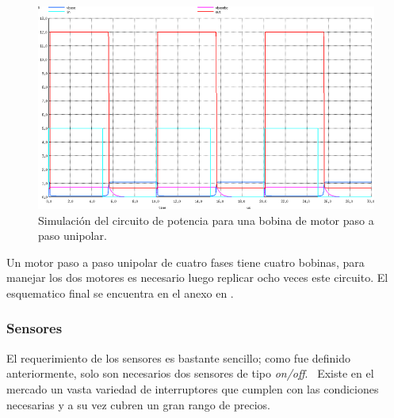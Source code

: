\begin{figure}[htp]
\centering
\includegraphics[width=15cm]{./img/cir_single_coil_plot.png}
\caption{Simulaci\'on del circuito de potencia para una bobina de motor paso a
paso unipolar.}
\label{fig:cir_single_coil_plot}
\end{figure}

Un motor paso a paso unipolar de cuatro fases tiene cuatro bobinas, para
manejar los dos motores es necesario luego replicar ocho veces este circuito.
El esquematico final se encuentra en el anexo en .






\subsubsection{Sensores}
%
El requerimiento de los sensores es bastante sencillo; como fue definido
anteriormente, solo son necesarios dos sensores de tipo \emph{on/off}. \
Existe en el mercado un vasta variedad de interruptores que cumplen con las
condiciones necesarias y a su vez cubren un gran rango de precios.\\
















